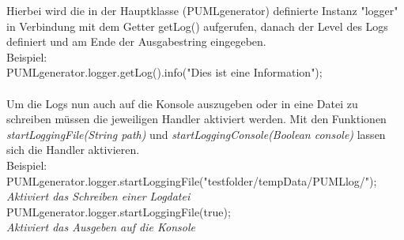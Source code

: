 Hierbei wird die in der Hauptklasse (PUMLgenerator) definierte Instanz "logger" in Verbindung mit dem Getter getLog() aufgerufen, danach der Level des Logs definiert und am Ende der Ausgabestring eingegeben.\\
Beispiel:\\
PUMLgenerator.logger.getLog().info("Dies ist eine Information");\\
\\
Um die Logs nun auch auf die Konsole auszugeben oder in eine Datei zu schreiben müssen die jeweiligen Handler aktiviert werden. Mit den Funktionen \textit{startLoggingFile(String path)} und \textit{startLoggingConsole(Boolean console)} lassen sich die Handler aktivieren.\\
Beispiel:\\
PUMLgenerator.logger.startLoggingFile("testfolder/tempData/PUMLlog/");\\
\textit{Aktiviert das Schreiben einer Logdatei}\\
PUMLgenerator.logger.startLoggingFile(true);\\
\textit{Aktiviert das Ausgeben auf die Konsole}\\\\


